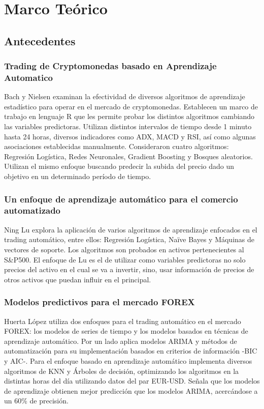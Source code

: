 \documentclass[a4paper,12pt]{Latex/Classes/PhDthesisPSnPDF}
\begin{document}
\chapter{Marco Teórico}

\section{Antecedentes}

\subsection{Trading de Cryptomonedas basado en Aprendizaje Automatico}

Bach y Nielsen examinan la efectividad de diversos algoritmos de aprendizaje estadístico para operar en el mercado de cryptomonedas. Establecen un marco de trabajo en lenguaje R que les permite probar los distintos algoritmos cambiando las variables predictoras. Utilizan distintos intervalos de tiempo desde 1 minuto hasta 24 horas, diversos indicadores como ADX, MACD y RSI, así como algunas asociaciones establecidas manualmente. Consideraron cuatro algoritmos: Regresión Logística, Redes Neuronales, Gradient Boosting y Bosques aleatorios. Utilizan el mismo enfoque buscando predecir la subida del precio dado un objetivo en un determinado período de tiempo.

\subsection{Un enfoque de aprendizaje automático para el comercio automatizado}

Ning Lu explora la aplicación de varios algoritmos de aprendizaje enfocados en el trading automático, entre ellos: Regresión Logística, Naïve Bayes y Máquinas de vectores de soporte. Los algoritmos son probados en activos pertenecientes al S\&P500. El enfoque de Lu es el de utilizar como variables predictoras no solo precios del activo en el cual se va a invertir, sino, usar información de precios de otros activos que puedan influir en el principal.

\subsection{Modelos predictivos para el mercado FOREX}

Huerta López utiliza dos enfoques para el trading automático en el mercado FOREX: los modelos de series de tiempo y los modelos basados en técnicas de aprendizaje automático. Por un lado aplica modelos ARIMA y métodos de automatización para su implementación basados en criterios de información -BIC y AIC-. Para el enfoque basado en aprendizaje automático implementa diversos algoritmos de KNN y Árboles de decisión, optimizando los algoritmos en la distintas horas del día utilizando datos del par EUR-USD. Señala que los modelos de aprendizaje obtienen mejor predicción que los modelos ARIMA, acercándose a un 60\% de precisión.
\end{document}

